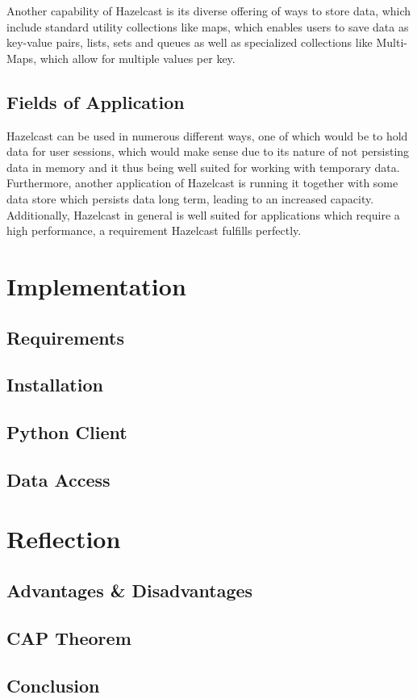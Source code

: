 Another capability of Hazelcast is its diverse offering of ways to store data, which include standard utility collections like maps, which enables users to save data as key-value pairs, lists, sets and queues as well as 
specialized collections like Multi-Maps, which allow for multiple values per key. \cite{Johns.2015}
\subsection{Fields of Application} \label{subsec:fieldsOfApplicationHazelcast}

Hazelcast can be used in numerous different ways, one of which would be to hold data for user sessions, which would make sense due to its nature 
of not persisting data in memory and it thus being well suited for working with temporary data. Furthermore, another application of Hazelcast is 
running it together with some data store which persists data long term, leading to an increased capacity. Additionally, Hazelcast in general is well 
suited for applications which require a high performance, a requirement Hazelcast fulfills perfectly. \cite{Johns.2015} \newline


\section{Implementation} \label{sec:implementationHazelcast}
\subsection{Requirements} \label{subsec:requirementsHazelcast}
\subsection{Installation} \label{subsec:installationHazelcast}
\subsection{Python Client} \label{subsec:pythonClientHazelcast}
\subsection{Data Access} \label{subsec:dataAccessHazelcast}

\section{Reflection} \label{sec:reflectionHazelcast}
\subsection{Advantages \& Disadvantages} \label{subsec:advantagesDisadvantagesHazelcast}
\subsection{CAP Theorem} \label{subsec:capTheoremHazelcast}
\subsection{Conclusion} \label{subsec:conclusionHazelcast}

